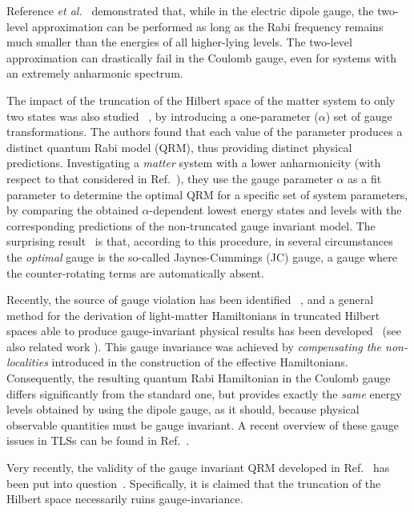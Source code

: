 \documentclass[aps,pra,reprint, superscriptaddress,amsmath,showpacs,longbibliography]{revtex4-2}
\begin{document}
Reference {\em et al.}~\cite{DeBernardis2018} demonstrated that,  while in the electric dipole gauge, the two-level approximation can be performed as long as the Rabi frequency remains much smaller than the energies of all higher-lying levels. The two-level approximation  can drastically
fail in the Coulomb gauge, even for systems with an extremely anharmonic spectrum.

The impact of the truncation of the Hilbert space of the matter system to only two states was  also studied ~\cite{Stokes2019}, by introducing a one-parameter ($\alpha$) set of gauge transformations. 
The authors {found} that each  value of the
parameter produces a distinct quantum Rabi model (QRM), thus providing distinct physical predictions. {I}nvestigating a {\em matter} system with a lower anharmonicity (with respect to that considered in Ref.~\cite{DeBernardis2018}),
they use the gauge parameter $\alpha$  as a  fit parameter to determine the optimal QRM for a specific set of system parameters, by comparing the obtained $\alpha$-dependent lowest energy states and levels with the corresponding predictions of the  non-truncated gauge invariant model. The surprising result~\cite{Stokes2019} is that, according to this procedure, in several circumstances the {\em optimal} gauge is the so-called Jaynes-Cummings (JC) gauge, a gauge where the counter-rotating terms are automatically absent.

Recently, the source of gauge violation has been identified {~\cite{DiStefano2019}}, and a general method for the derivation of light-matter Hamiltonians
in truncated Hilbert spaces able to produce gauge-invariant physical results has been developed{~\cite{DiStefano2019}}
(see also related work \cite{Settineri2020, Garziano2020,SDN2020}). 
This gauge invariance {was} achieved by {\em compensating the non-localities} introduced in the construction of the effective Hamiltonians. Consequently, the resulting
quantum Rabi Hamiltonian in the Coulomb gauge differs significantly  from the standard one, but provides exactly the {\em same}
energy levels obtained by using the dipole gauge, as it should, because physical observable quantities must be gauge invariant. A recent overview of these gauge issues in TLSs can be found
in Ref.~\cite{LeBoite2020}.

Very recently, the validity of the gauge invariant {QRM} developed in Ref.~\cite{DiStefano2019} has been put into question~\cite{Stokes2020a}.
Specifically, it is claimed that  the truncation of the Hilbert space necessarily ruins gauge-invariance.
\end{document}
